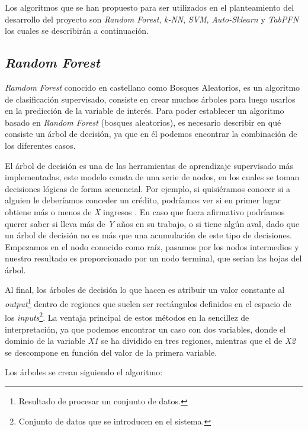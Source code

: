 Los algoritmos que se han propuesto para ser utilizados en el planteamiento del desarrollo del proyecto son \textit{Random Forest}, \textit{k-NN}, \textit{SVM}, \textit{Auto-Sklearn} y \textit{TabPFN} los cuales se describirán a continuación.

\subsection{\textit{Random Forest}}
\textit{Ramdom Forest} conocido en castellano como Bosques Aleatorios, es un algoritmo de clasificación supervisado, consiste en crear muchos árboles para luego usarlos en la predicción de la variable de interés. Para poder establecer un algoritmo basado en \textit{Random Forest} (bosques aleatorios), es necesario describir en qué consiste un árbol de decisión, ya que en él podemos encontrar la combinación de los diferentes casos.

El árbol de decisión es una de las herramientas de aprendizaje supervisado más implementadas, este modelo consta de una serie de nodos, en los cuales se toman decisiones lógicas de forma secuencial. Por ejemplo, si quisiéramos conocer si a alguien le deberíamos conceder un crédito, podríamos ver si en primer lugar obtiene más o menos de \textit{X} ingresos \cite{AndresAlbelda}. En caso que fuera afirmativo podríamos querer saber si lleva más de \textit{Y} años en su trabajo, o si tiene algún aval, dado que un árbol de decisión no es más que una acumulación de este tipo de decisiones. Empezamos en el nodo conocido como raíz, pasamos por los nodos intermedios y nuestro resultado es proporcionado por un nodo terminal, que serían las hojas del árbol.

Al final, los árboles de decisión lo que hacen es atribuir un valor constante al \textit{output}\footnote{Resultado de procesar un conjunto de datos.} dentro de regiones que suelen ser rectángulos definidos en el espacio de los \textit{inputs}\footnote{Conjunto de datos que se introducen en el sistema.}. La ventaja principal de estos métodos en la sencillez de interpretación, ya que podemos encontrar un caso con dos variables, donde el dominio de la variable \textit{X1} se ha dividido en tres regiones, mientras que el de \textit{X2} se descompone en función del valor de la primera variable.

Los árboles se crean siguiendo el algoritmo:



